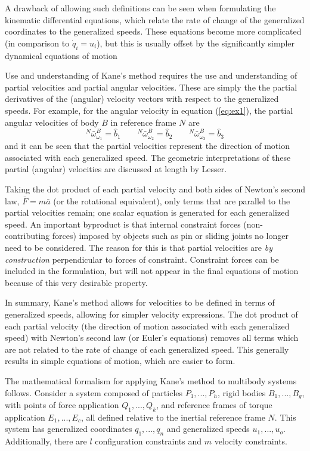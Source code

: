 \documentclass[smallcondensed,final]{svjour3}                     %
\begin{document}
A drawback of allowing such definitions can be seen when formulating the
kinematic differential equations, which relate the rate of change of the
generalized coordinates to the generalized speeds. These equations become more
complicated (in comparison to $\dot{q}_i = u_i$), but this is usually offset by
the significantly simpler dynamical equations of motion\cite{Mitiguy1996}

Use and understanding of Kane's method requires the use and understanding of
partial velocities and partial angular velocities. These are simply the the
partial derivatives of the (angular) velocity vectors with respect to the
generalized speeds. For example, for the angular velocity in equation
(\ref{eq:ex1}), the partial angular velocities of body $B$ in reference frame
$N$ are
\[
{^N}\bar{\omega}^B_{\omega_1} = \hat{b}_1 \quad \quad
{^N}\bar{\omega}^B_{\omega_2} = \hat{b}_2 \quad \quad
{^N}\bar{\omega}^B_{\omega_3} = \hat{b}_3
\]
and it can be seen that the partial velocities represent the direction of
motion associated with each generalized speed. The geometric interpretations of
these partial (angular) velocities are discussed at length by
Lesser\cite{Lesser1992}.

Taking the dot product of each partial velocity and both sides of Newton's
second law, $\bar{F}=m\bar{a}$ (or the rotational equivalent), only terms that
are parallel to the partial velocities remain; one scalar equation is generated
for each generalized speed. An important byproduct is that internal constraint forces
(non-contributing forces) imposed by objects such as pin or sliding joints no
longer need to be considered. The reason for this is that partial velocities
are \textit{by construction} perpendicular to forces of constraint. Constraint
forces can be included in the formulation, but will not appear in the final
equations of motion because of this very desirable property.

In summary, Kane's method allows for velocities to be defined in terms of
generalized speeds, allowing for simpler velocity expressions.  The dot product
of each partial velocity (the direction of motion associated with each
generalized speed) with Newton's second law (or Euler's equations) removes all
terms which are not related to the rate of change of each generalized speed.
This generally results in simple equations of motion, which are easier to form.

The mathematical formalism for applying Kane's method to multibody systems
follows. Consider a system composed of particles $P_1,...,P_h$, rigid bodies
$B_1,...,B_g$, with points of force application $Q_1,...,Q_k$, and reference
frames of torque application $E_1,...,E_c$, all defined relative to the
inertial reference frame $N$. This system has generalized coordinates
$q_1,...,q_n$ and generalized speeds $u_1,...,u_o$. Additionally, there are $l$
configuration constraints and $m$ velocity constraints.
\end{document}
